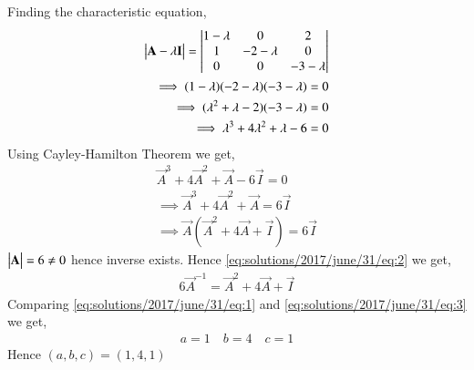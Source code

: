 Finding the characteristic equation,
\begin{align}
\begin{vmatrix}\mathbf{A}-\lambda\mathbf{I}\end{vmatrix} =\begin{vmatrix}1-\lambda&0&2\\1&-2-\lambda&0\\0&0&-3-\lambda\end{vmatrix}\\
\implies (1-\lambda)(-2-\lambda)(-3-\lambda)=0\\
\implies (\lambda^2+\lambda-2)(-3-\lambda)=0\\
\implies \lambda^3+4\lambda^2+\lambda-6 = 0
\end{align}
Using Cayley-Hamilton Theorem we get,
\begin{align}
\vec{A}^3+4\vec{A}^2+\vec{A}-6\vec{I}=0\\
\implies\vec{A}^3+4\vec{A}^2+\vec{A} = 6\vec{I}\\
\implies\vec{A}(\vec{A}^2+4\vec{A}+\vec{I})= 6\vec{I} \label{eq:solutions/2017/june/31/eq:2}
\end{align}
$\begin{vmatrix}\mathbf{A}\end{vmatrix} =6 \neq 0$ hence inverse exists. Hence \eqref{eq:solutions/2017/june/31/eq:2} we get,
\begin{align}
6\vec{A}^{-1} = \vec{A}^2+4\vec{A}+\vec{I} \label{eq:solutions/2017/june/31/eq:3}
\end{align} 
Comparing \eqref{eq:solutions/2017/june/31/eq:1} and \eqref{eq:solutions/2017/june/31/eq:3} we get,
\begin{align}
a=1 \quad b=4 \quad c=1
\end{align}
Hence $(a,b,c)= (1,4,1)$  
